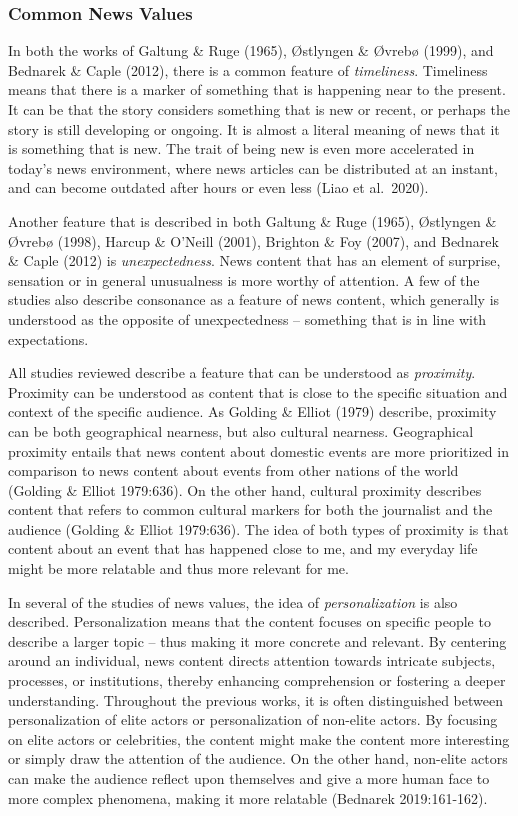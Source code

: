 \documentclass[
]{article}
\begin{document}
\hypertarget{common-news-values}{%
\subsubsection{Common News Values}\label{common-news-values}}

\noindent In both the works of Galtung \& Ruge (1965), Østlyngen \&
Øvrebø (1999), and Bednarek \& Caple (2012), there is a common feature
of \emph{timeliness}. Timeliness means that there is a marker of
something that is happening near to the present. It can be that the
story considers something that is new or recent, or perhaps the story is
still developing or ongoing. It is almost a literal meaning of news that
it is something that is new. The trait of being new is even more
accelerated in today's news environment, where news articles can be
distributed at an instant, and can become outdated after hours or even
less (Liao et al.~2020).

Another feature that is described in both Galtung \& Ruge (1965),
Østlyngen \& Øvrebø (1998), Harcup \& O'Neill (2001), Brighton \& Foy
(2007), and Bednarek \& Caple (2012) is \emph{unexpectedness}. News
content that has an element of surprise, sensation or in general
unusualness is more worthy of attention. A few of the studies also
describe consonance as a feature of news content, which generally is
understood as the opposite of unexpectedness -- something that is in
line with expectations.

All studies reviewed describe a feature that can be understood as
\emph{proximity}. Proximity can be understood as content that is close
to the specific situation and context of the specific audience. As
Golding \& Elliot (1979) describe, proximity can be both geographical
nearness, but also cultural nearness. Geographical proximity entails
that news content about domestic events are more prioritized in
comparison to news content about events from other nations of the world
(Golding \& Elliot 1979:636). On the other hand, cultural proximity
describes content that refers to common cultural markers for both the
journalist and the audience (Golding \& Elliot 1979:636). The idea of
both types of proximity is that content about an event that has happened
close to me, and my everyday life might be more relatable and thus more
relevant for me.

In several of the studies of news values, the idea of
\emph{personalization} is also described. Personalization means that the
content focuses on specific people to describe a larger topic -- thus
making it more concrete and relevant. By centering around an individual,
news content directs attention towards intricate subjects, processes, or
institutions, thereby enhancing comprehension or fostering a deeper
understanding. Throughout the previous works, it is often distinguished
between personalization of elite actors or personalization of non-elite
actors. By focusing on elite actors or celebrities, the content might
make the content more interesting or simply draw the attention of the
audience. On the other hand, non-elite actors can make the audience
reflect upon themselves and give a more human face to more complex
phenomena, making it more relatable (Bednarek 2019:161-162).
\end{document}
